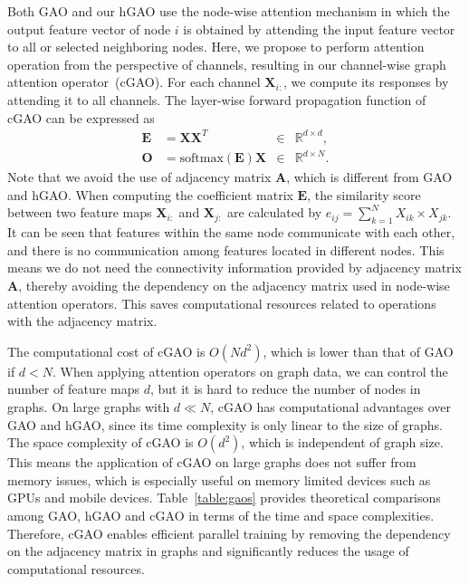 \documentclass[sigconf]{acmart}
\begin{document}
Both GAO and our hGAO use the node-wise attention mechanism in which
the output feature vector of node $i$ is obtained by attending the
input feature vector to all or selected neighboring nodes. Here, we
propose to perform attention operation from the perspective of
channels, resulting in our channel-wise graph attention
operator~(cGAO). For each channel $\boldsymbol X_{i:}$, we compute
its responses by attending it to all channels. The layer-wise
forward propagation function of cGAO can be expressed as
\begin{equation}
\begin{aligned}
\boldsymbol E &= \boldsymbol X \boldsymbol X^T  &\in& \mathbb{R}^{d\times d},\\
\boldsymbol O &= \mbox{softmax}(\boldsymbol E) \boldsymbol X &\in&
\mathbb{R}^{d\times N}.
\end{aligned}
\end{equation}
Note that we avoid the use of adjacency matrix $\boldsymbol A$,
which is different from GAO and hGAO. When computing the coefficient
matrix $\boldsymbol E$, the similarity score between two feature
maps $\boldsymbol X_{i:}$ and $\boldsymbol X_{j:}$ are calculated by
$e_{ij} = \sum_{k=1}^{N} X_{ik} \times X_{jk}$. It can be seen that
features within the same node communicate with each other, and there
is no communication among features located in different nodes. This
means we do not need the connectivity information provided by
adjacency matrix $\boldsymbol A$, thereby avoiding the dependency on
the adjacency matrix used in node-wise attention operators. This
saves computational resources related to operations with the
adjacency matrix.

The computational cost of cGAO is $O(Nd^2)$, which is lower than
that of GAO if $d < N$. When applying attention operators on graph
data, we can control the number of feature maps $d$, but it is hard
to reduce the number of nodes in graphs. On large graphs with $d \ll
N$, cGAO has computational advantages over GAO and hGAO, since its
time complexity is only linear to the size of graphs. The space
complexity of cGAO is $O(d^2)$, which is independent of graph size.
This means the application of cGAO on large graphs does not suffer
from memory issues, which is especially useful on memory limited
devices such as GPUs and mobile devices. Table~\ref{table:gaos}
provides theoretical comparisons among GAO, hGAO and cGAO in terms
of the time and space complexities. Therefore, cGAO enables
efficient parallel training by removing the dependency on the
adjacency matrix in graphs and significantly reduces the usage of
computational resources.
\end{document}
